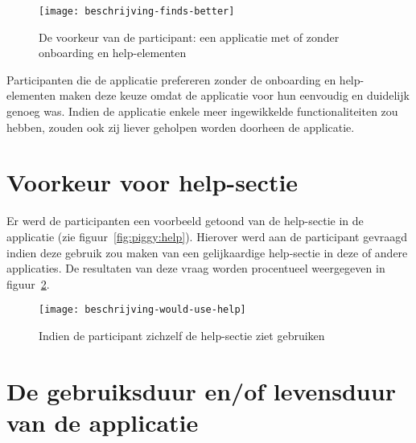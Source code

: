 \begin{figure}[h]
    \centering
    \texttt{[image: beschrijving-finds-better]}
    \caption{De voorkeur van de participant: een applicatie met of zonder onboarding en help-elementen}
    \label{fig:beschrijving-finds-better}
\end{figure}

Participanten die de applicatie prefereren zonder de onboarding en help-elementen maken deze keuze omdat de applicatie voor hun eenvoudig en duidelijk genoeg was. Indien de applicatie enkele meer ingewikkelde functionaliteiten zou hebben, zouden ook zij liever geholpen worden doorheen de applicatie.

\section{Voorkeur voor help-sectie}
\label{sec:voorkeur-help}

Er werd de participanten een voorbeeld getoond van de help-sectie in de applicatie (zie figuur~\ref{fig:piggy:help}). Hierover werd aan de participant gevraagd indien deze gebruik zou maken van een gelijkaardige help-sectie in deze of andere applicaties. De resultaten van deze vraag worden procentueel weergegeven in figuur~\ref{fig:beschrijving-would-use-help}.

\begin{figure}[h]
    \centering
    \texttt{[image: beschrijving-would-use-help]}
    \caption{Indien de participant zichzelf de help-sectie ziet gebruiken}
    \label{fig:beschrijving-would-use-help}
\end{figure}

\section{De gebruiksduur en/of levensduur van de applicatie}
\label{sec:gebruiksduur}

